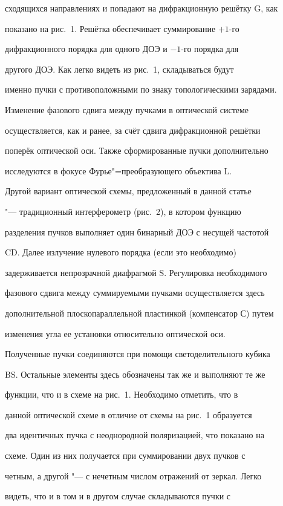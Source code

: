 сходящихся направлениях и попадают на дифракционную решётку G, как

показано на рис.~1. Решётка обеспечивает суммирование $+1$-го

дифракционного порядка для одного ДОЭ и $-1$-го порядка для

другого ДОЭ. Как легко видеть из рис.~1, складываться будут

именно пучки с противоположными по знаку топологическими зарядами.

Изменение фазового сдвига между пучками в оптической системе

осуществляется, как и ранее, за счёт сдвига дифракционной решётки

поперёк оптической оси. Также сформированные пучки дополнительно

исследуются в фокусе Фурье"=преобразующего объектива L.



Другой вариант оптической схемы, предложенный в данной статье

 "--- традиционный интерферометр (рис.~2), в котором функцию

разделения пучков выполняет один бинарный ДОЭ с несущей частотой

CD. Далее излучение нулевого порядка (если это необходимо)

задерживается непрозрачной диафрагмой S. Регулировка необходимого

фазового сдвига между суммируемыми пучками осуществляется здесь

дополнительной плоскопараллельной пластинкой (компенсатор С) путем

изменения угла ее установки относительно оптической оси.



Полученные пучки соединяются при помощи светоделительного кубика

BS. Остальные элементы здесь обозначены так же и выполняют те же

функции, что и в схеме на рис.~1. Необходимо отметить, что в

данной оптической схеме в отличие от схемы на рис.~1 образуется

два идентичных пучка с неоднородной поляризацией, что показано на

схеме. Один из них получается при суммировании двух пучков с

четным, а другой "--- с нечетным числом отражений от зеркал. Легко

видеть, что и в том и в другом случае складываются пучки с

